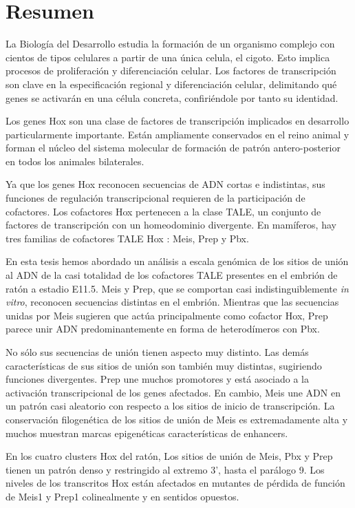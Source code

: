 \chapter{Resumen}
\restorepagenumber

La Biología del Desarrollo estudia la formación de un organismo complejo con cientos de tipos celulares a partir de una única celula, el cigoto. Esto implica procesos de proliferación y diferenciación celular. Los factores de transcripción son clave en la especificación regional y diferenciación celular, delimitando qué genes se activarán en una célula concreta, confiriéndole por tanto su identidad. 

Los genes Hox son una clase de factores de transcripción implicados en desarrollo particularmente importante. Están ampliamente conservados en el reino animal y forman el núcleo del sistema molecular de formación de patrón antero-posterior en todos los animales bilaterales. 

Ya que los genes Hox reconocen secuencias de ADN cortas e indistintas, sus funciones de regulación transcripcional requieren de la participación de cofactores. Los cofactores Hox pertenecen a la clase TALE, un conjunto de factores de transcripción con un homeodominio divergente. En mamíferos, hay tres familias de cofactores TALE Hox : Meis, Prep y Pbx. 

En esta tesis hemos abordado un análisis a escala genómica de los sitios de unión al ADN de la casi totalidad de los cofactores TALE presentes en el embrión de ratón a estadio E11.5. Meis y Prep, que se comportan casi indistinguiblemente \textit{in vitro}, reconocen secuencias distintas en el embrión. Mientras que las secuencias unidas por Meis sugieren que actúa principalmente como cofactor Hox, Prep parece unir ADN predominantemente en forma de heterodímeros con Pbx. 

No sólo sus secuencias de unión tienen aspecto muy distinto. Las demás características de sus sitios de unión son también muy distintas, sugiriendo funciones divergentes. Prep une muchos promotores y está asociado a la activación transcripcional de los genes afectados. En cambio, Meis une ADN en un patrón casi aleatorio con respecto a los sitios de inicio de transcripción. La conservación filogenética de los sitios de unión de Meis es extremadamente alta y muchos muestran marcas epigenéticas características de enhancers. 

En los cuatro clusters Hox del ratón, Los sitios de unión de Meis, Pbx y Prep tienen un patrón denso y restringido al extremo 3', hasta el parálogo 9. Los niveles de los transcritos Hox están afectados en mutantes de pérdida de función de Meis1 y Prep1 colinealmente y en sentidos opuestos.


